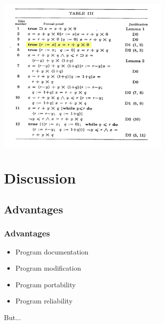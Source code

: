 \documentclass{beamer}
\begin{document}
\begin{frame}
        \center
        \includegraphics[width = 8.5cm] {proof4.png}
\end{frame}

\section{Discussion}
\subsection{Advantages}
\begin{frame}
        \frametitle{Advantages}
        \begin{itemize}
                \item Program documentation
                \item Program modification
                \item Program portability
                \item Program reliability
         \end{itemize}
        \pause
	\center
        But...
        \end{frame}

\end{document}
